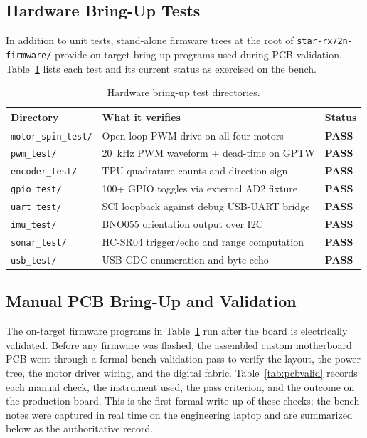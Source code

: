 \documentclass[11pt,letterpaper]{article}
\newcommand{\pass}{{\color{passgreen}\textbf{PASS}}}
\begin{document}
\subsection{Hardware Bring-Up Tests}
In addition to unit tests, stand-alone firmware trees at the root of
\texttt{star-rx72n-firmware/} provide on-target bring-up programs used
during PCB validation. Table~\ref{tab:bringup} lists each test and its
current status as exercised on the bench.

\begin{table}[H]
\centering
\caption{Hardware bring-up test directories.}
\label{tab:bringup}
\small
\begin{tabularx}{\linewidth}{l X l}
\toprule
\textbf{Directory} & \textbf{What it verifies} & \textbf{Status} \\
\midrule
\texttt{motor\_spin\_test/}   & Open-loop PWM drive on all four motors              & \pass{} \\
\texttt{pwm\_test/}           & \qty{20}{\kilo\hertz} PWM waveform + dead-time on GPTW & \pass{} \\
\texttt{encoder\_test/}       & TPU quadrature counts and direction sign             & \pass{} \\
\texttt{gpio\_test/}          & 100+ GPIO toggles via external AD2 fixture           & \pass{} \\
\texttt{uart\_test/}          & SCI loopback against debug USB-UART bridge          & \pass{} \\
\texttt{imu\_test/}           & BNO055 orientation output over I2C                  & \pass{} \\
\texttt{sonar\_test/}         & HC-SR04 trigger/echo and range computation          & \pass{} \\
\texttt{usb\_test/}           & USB CDC enumeration and byte echo                   & \pass{} \\
\bottomrule
\end{tabularx}
\end{table}

\subsection{Manual PCB Bring-Up and Validation}
The on-target firmware programs in Table~\ref{tab:bringup} run after
the board is electrically validated. Before any firmware was flashed,
the assembled custom motherboard PCB went through a formal bench
validation pass to verify the layout, the power tree, the motor
driver wiring, and the digital fabric. Table~\ref{tab:pcbvalid}
records each manual check, the instrument used, the pass criterion,
and the outcome on the production board. This is the first formal
write-up of these checks; the bench notes were captured in real
time on the engineering laptop and are summarized below as the
authoritative record.
\end{document}
